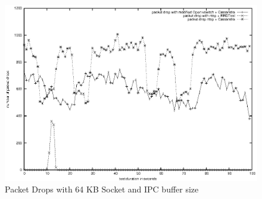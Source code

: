 	  \begin{figure}[!htb]
	    \centering
	    \includegraphics[scale=1]{data/out64}
	    \caption{Packet Drops with 64 KB Socket and IPC buffer size } 
	  \label{graph64}
	  \end{figure}
	  
